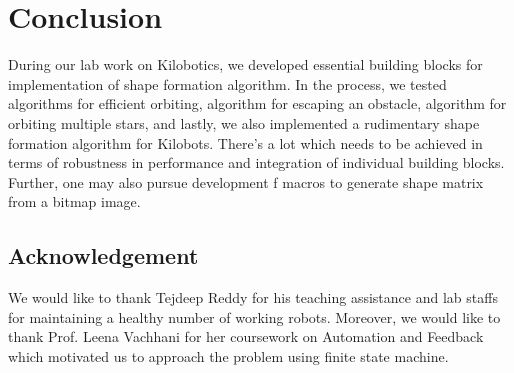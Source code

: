 \documentclass{report}[12pt]
\begin{document}
\chapter{Conclusion}
During our lab work on Kilobotics, we developed essential building blocks for implementation of shape formation algorithm. In the process, we tested algorithms for efficient orbiting, algorithm for escaping an obstacle, algorithm for orbiting multiple stars, and lastly, we also implemented a rudimentary shape formation algorithm for Kilobots. There's a lot which needs to be achieved in terms of robustness in performance and integration of individual building blocks. Further, one may also pursue development f macros to generate shape matrix from a bitmap image.
\section{Acknowledgement}
We would like to thank Tejdeep Reddy for his teaching assistance and lab staffs for maintaining a healthy number of working robots. Moreover, we would like to thank Prof. Leena Vachhani for her coursework on Automation and Feedback which motivated us to approach the problem using finite state machine.
{}

\end{document}
